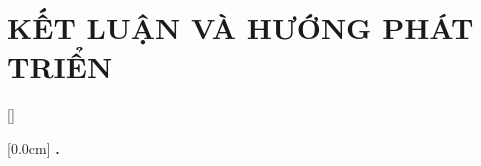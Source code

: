 \documentclass[a4paper,13pt,3p,oneside]{report}
\renewcommand{\bibname}{Danh_sach_tai_lieu_tham_khao}
\theoremstyle{definition}
\begin{document}
\chapter{KẾT LUẬN VÀ HƯỚNG PHÁT TRIỂN} %
\label{chapter:conclusion}


% 


\newpage
\renewcommand\bibname{TÀI LIỆU THAM KHẢO}
\printbibliography
{}



{}[]
\titlespacing*{\chapter}{0pt}{-20pt}{20pt}

    [0.0cm]             %
    {\bfseries\vspace{0.3cm}}                  %
    {{\bfseries{\scshape} \thecontentslabel.\ }} %
    {}         %
    {\contentspage}         %
% 
% 
\end{document}

